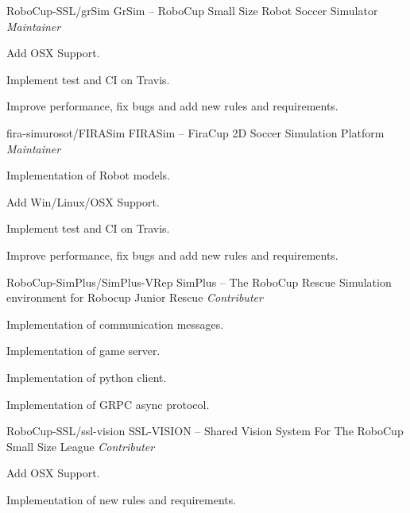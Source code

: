 
\begin{cventries}
  \cventry
    {RoboCup-SSL/grSim} %
    {GrSim -- RoboCup Small Size Robot Soccer Simulator } %
    {\textit{Maintainer}} %
    {} %
    {
      \begin{cvitems} %
        \item {Add OSX Support.}
        \item {Implement test and CI on Travis.}
        \item {Improve performance, fix bugs and add new rules and requirements.}
      \end{cvitems}
    }
    
  \cventry
    {fira-simurosot/FIRASim} %
    {FIRASim -- FiraCup 2D Soccer Simulation Platform } %
    {\textit{Maintainer}} %
    {} %
    {
      \begin{cvitems} %
        \item {Implementation of Robot models.}
        \item {Add Win/Linux/OSX Support.}
        \item {Implement test and CI on Travis.}
        \item {Improve performance, fix bugs and add new rules and requirements.}
      \end{cvitems}
    }
    
  \cventry
    {RoboCup-SimPlus/SimPlus-VRep} %
    {SimPlus -- The RoboCup Rescue Simulation environment for  Robocup Junior Rescue} %
    {\textit{Contributer}} %
    {} %
    {
      \begin{cvitems} %
        \item {Implementation of communication messages.}
        \item {Implementation of game server.}
        \item {Implementation of python client.}
        \item {Implementation of GRPC async protocol.}
      \end{cvitems}
    }
    
  \cventry
    {RoboCup-SSL/ssl-vision} %
    {SSL-VISION -- Shared Vision System For The RoboCup Small Size League} %
    {\textit{Contributer}} %
    {} %
    {
      \begin{cvitems} %
        \item {Add OSX Support.}
        \item {Implementation of new rules and requirements.}
      \end{cvitems}
    }
    

    
    

    
\end{cventries}